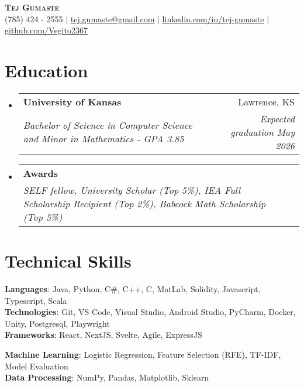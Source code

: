 \documentclass[letterpaper,10.5pt]{article}
\makeatletter
\newcommand{\resumeSubheading}[4]{
  \vspace{-2pt}\item
    \begin{tabular*}{0.97\textwidth}[t]{l@{\extracolsep{\fill}}r}
      \textbf{#1} & #2 \\
      \textit{\small#3} & \textit{\small #4} \\
    \end{tabular*}\vspace{-7pt}
}
\newcommand{\resumeSubHeadingListStart}{\begin{itemize}[leftmargin=0.15in, label={}]}
\newcommand{\resumeSubHeadingListEnd}{\end{itemize}}
\makeatother
\begin{document}

\begin{center}
    \textbf{\Huge \scshape Tej Gumaste} \\ \vspace{1pt}
    \small (785) 424 - 2555 $|$ \href{mailto:tej.gumaste@gmail.com}{\underline{tej.gumaste@gmail.com}} $|$ 
    \href{https://www.linkedin.com/in/tej-gumaste/}{\underline{linkedin.com/in/tej-gumaste}} $|$
    \href{https://www.github.com/Vegito2367}{\underline{github.com/Vegito2367}}
\end{center}


\section{Education}
  \resumeSubHeadingListStart
    \resumeSubheading
      {University of Kansas}{Lawrence, KS}
      {Bachelor of Science in Computer Science and Minor in Mathematics - GPA 3.85} {Expected graduation May 2026}
      \resumeSubheading
      {Awards}{}
      {SELF fellow, University Scholar (Top 5\%), IEA Full Scholarship Recipient (Top 2\%), Babcock Math Scholarship (Top 5\%)}{}

  \resumeSubHeadingListEnd

\section{Technical Skills}
 \begin{itemize}[leftmargin=0.15in, label={}]
    \small{\item{
     \textbf{Languages}{: Java, Python, C\#, C++, C, MatLab, Solidity, Javascript, Typescript, Scala} \\
     \textbf{Technologies}{: Git, VS Code, Visual Studio, Android Studio, PyCharm, Docker, Unity, Postgresql, Playwright} \\
     \textbf{Frameworks}{: React, NextJS, Svelte, Agile, ExpressJS}\\
    }}
    \textbf{Machine Learning}{: Logistic Regression, Feature Selection (RFE), TF-IDF, Model Evaluation}\\
     \textbf{Data Processing}{: NumPy, Pandas, Matplotlib, Sklearn}
    
    
 \end{itemize}
  
\end{document}
